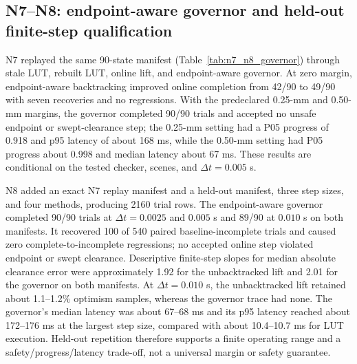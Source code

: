 \documentclass[preprint,12pt]{elsarticle}
\begin{document}
\subsection{N7--N8: endpoint-aware governor and held-out finite-step qualification}

N7 replayed the same 90-state manifest (Table~\ref{tab:n7_n8_governor}) through stale LUT, rebuilt LUT, online lift, and endpoint-aware governor. At zero margin, endpoint-aware backtracking improved online completion from 42/90 to 49/90 with seven recoveries and no regressions. With the predeclared 0.25-mm and 0.50-mm margins, the governor completed 90/90 trials and accepted no unsafe endpoint or swept-clearance step; the 0.25-mm setting had a P05 progress of 0.918 and p95 latency of about 168 ms, while the 0.50-mm setting had P05 progress about 0.998 and median latency about 67 ms. These results are conditional on the tested checker, scenes, and $\Delta t=0.005$ s.

N8 added an exact N7 replay manifest and a held-out manifest, three step sizes, and four methods, producing 2160 trial rows. The endpoint-aware governor completed 90/90 trials at $\Delta t=0.0025$ and $0.005$ s and 89/90 at $0.010$ s on both manifests. It recovered 100 of 540 paired baseline-incomplete trials and caused zero complete-to-incomplete regressions; no accepted online step violated endpoint or swept clearance. Descriptive finite-step slopes for median absolute clearance error were approximately 1.92 for the unbacktracked lift and 2.01 for the governor on both manifests. At $\Delta t=0.010$ s, the unbacktracked lift retained about 1.1--1.2\% optimism samples, whereas the governor trace had none. The governor's median latency was about 67--68 ms and its p95 latency reached about 172--176 ms at the largest step size, compared with about 10.4--10.7 ms for LUT execution. Held-out repetition therefore supports a finite operating range and a safety/progress/latency trade-off, not a universal margin or safety guarantee.
\end{document}
